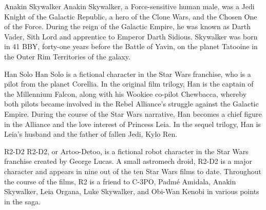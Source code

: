 \documentclass[10pt,journal,compsoc,UTF8]{IEEEtran}
\begin{document}
\cleardoublepage
% 
% 

\newpage
\begin{IEEEbiography}{Anakin Skywalker}
  Anakin Skywalker, a Force-sensitive human male, was a Jedi Knight of the Galactic Republic, a hero of the Clone Wars, and the Chosen One of the Force. During the reign of the Galactic Empire, he was known as Darth Vader, Sith Lord and apprentice to Emperor Darth Sidious. Skywalker was born in 41 BBY, forty-one years before the Battle of Yavin, on the planet Tatooine in the Outer Rim Territories of the galaxy. 
\end{IEEEbiography}
\begin{IEEEbiography}{Han Solo}
  Han Solo is a fictional character in the Star Wars franchise, who is a pilot from the planet Corellia. In the original film trilogy, Han is the captain of the Millennium Falcon, along with his Wookiee co-pilot Chewbacca, whereby both pilots became involved in the Rebel Alliance's struggle against the Galactic Empire. During the course of the Star Wars narrative, Han becomes a chief figure in the Alliance and the love interest of Princess Leia. In the sequel trilogy, Han is Leia's husband and the father of fallen Jedi, Kylo Ren.
\end{IEEEbiography}
\begin{IEEEbiographynophoto}{R2-D2}
  R2-D2, or Artoo-Detoo, is a fictional robot character in the Star Wars franchise created by George Lucas. A small astromech droid, R2-D2 is a major character and appears in nine out of the ten Star Wars films to date. Throughout the course of the films, R2 is a friend to C-3PO, Padmé Amidala, Anakin Skywalker, Leia Organa, Luke Skywalker, and Obi-Wan Kenobi in various points in the saga.
\end{IEEEbiographynophoto}

\end{document}
